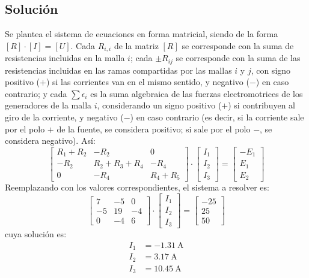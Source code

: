   \subsection*{Solución}
  Se plantea el sistema de ecuaciones en forma matricial, siendo de la forma $[R]\cdot[I]=[U]$. Cada $R_{i,i}$ de la matriz $[R]$ se corresponde con la suma de resistencias incluidas en la malla $i$; cada $\pm R_{ij}$ se corresponde con la suma de las resistencias incluidas en las ramas compartidas por las mallas $i$ y $j$, con signo positivo ($+$) si las corrientes van en el mismo sentido, y negativo ($-$) en caso contrario; y cada $\sum \epsilon_i$ es la suma algebraica de las fuerzas electromotrices de los generadores de la malla $i$, considerando un signo positivo ($+$) si contribuyen al giro de la corriente, y negativo ($-$) en caso contrario (es decir, si la corriente sale por el polo $+$ de la fuente, se considera positivo; si sale por el polo $-$, se considera negativo). Así:
  \begin{equation*}
    \begin{bmatrix}
      R_1+R_2 & -R_2 & 0 \\
      -R_2 & R_2+R_3+R_4 & -R_4 \\
      0 & -R_4 & R_4+R_5
    \end{bmatrix} \cdot
    \begin{bmatrix}
      I_1\\
      I_2\\
      I_3
    \end{bmatrix} = %
    \begin{bmatrix}
      -E_1 \\
      E_1\\
      E_2
    \end{bmatrix}
  \end{equation*}
  Reemplazando con los valores correspondientes, el sistema a resolver es:
  \begin{equation*}
    \begin{bmatrix}
      7 & -5 & 0 \\
      -5 & 19 & -4 \\
      0 & -4 & 6
    \end{bmatrix} \cdot
    \begin{bmatrix}
      I_1\\
      I_2\\
      I_3
    \end{bmatrix} = %
    \begin{bmatrix}
      -25 \\
      25\\
      50
    \end{bmatrix}
  \end{equation*}
  cuya solución es:
  \begin{align*}
    I_1&=\qty{-1.31}{\ampere}\\
    I_2&=\qty{3.17}{\ampere}\\
    I_3&=\qty{10.45}{\ampere}
  \end{align*}

